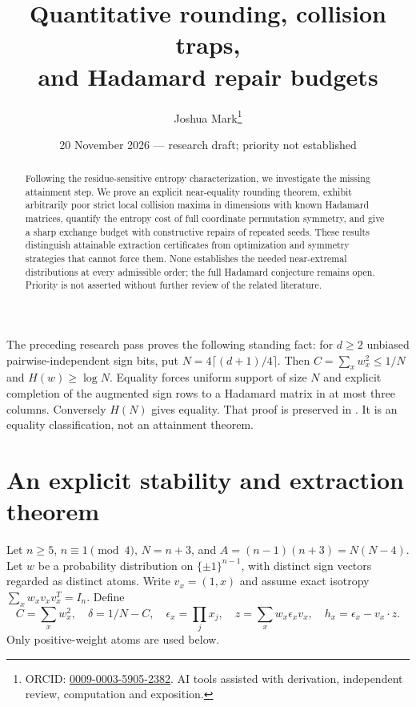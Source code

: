 \documentclass[11pt]{article}
\title{Quantitative rounding, collision traps,\\and Hadamard repair budgets}
\author{Joshua Mark\thanks{ORCID: \href{https://orcid.org/0009-0003-5905-2382}{0009-0003-5905-2382}. AI tools assisted with derivation, independent review, computation and exposition.}}
\date{20 November 2026 --- research draft; priority not established}
\begin{document}
\maketitle

\begin{abstract}
Following the residue-sensitive entropy characterization, we investigate
the missing attainment step. We prove an explicit near-equality
rounding theorem, exhibit arbitrarily poor strict local collision
maxima in dimensions with known Hadamard matrices, quantify the
entropy cost of full coordinate permutation symmetry, and give a
sharp exchange budget with constructive repairs of repeated seeds.
These results distinguish attainable extraction certificates from
optimization and symmetry strategies that cannot force them. None
establishes the needed near-extremal distributions at every admissible
order; the full Hadamard conjecture remains open. Priority is not
asserted without further review of the related literature.
\end{abstract}
The preceding research pass proves the following standing fact:
for $d\ge2$ unbiased pairwise-independent sign bits, put
$N=4\lceil(d+1)/4\rceil$. Then $C=\sum_xw_x^2\le1/N$ and
$H(w)\ge\log N$. Equality forces uniform support of size $N$
and explicit completion of the augmented sign rows to a Hadamard
matrix in at most three columns. Conversely $H(N)$ gives equality.
That proof is preserved in .
It is an equality classification, not an attainment theorem.

\section{An explicit stability and extraction theorem}

Let $n\ge5$, $n\equiv1\pmod4$, $N=n+3$, and
$A=(n-1)(n+3)=N(N-4)$. Let $w$ be a probability distribution on
$\{\pm1\}^{n-1}$, with distinct sign vectors regarded as distinct atoms.
Write $v_x=(1,x)$ and assume exact isotropy
$\sum_x w_xv_xv_x^T=I_n$. Define
\[
 C=\sum_xw_x^2,\quad \delta=1/N-C,\quad
 \epsilon_x=\prod_jx_j,\quad z=\sum_xw_x\epsilon_xv_x,
 \quad h_x=\epsilon_x-v_x\cdot z.
\]
Only positive-weight atoms are used below.
\end{document}
